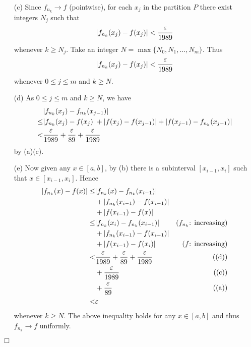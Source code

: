 \documentclass{article}
\begin{document}
\begin{enumerate}
\begin{enumerate}
  \item[(c)]
    Since $f_{n_k} \to f$ (pointwise), for each $x_j$ in the partition $P$
    there exist integers $N_j$ such that
    \[
      \abs{ f_{n_k}(x_j) - f(x_j) } < \frac{\varepsilon}{1989}
    \]
    whenever $k \geq N_j$.
    Take an integer $N = \max\{N_0, N_1, \ldots, N_m\}$. Thus
    \[
      \abs{ f_{n_k}(x_j) - f(x_j) } < \frac{\varepsilon}{1989}
    \]
    whenever $0 \leq j \leq m$ and $k \geq N$.

  \item[(d)]
    As $0 \leq j \leq m$ and $k \geq N$, we have
      \begin{align*}
        &\abs{f_{n_k}(x_j) - f_{n_k}(x_{j-1})} \\
        \leq&
        \abs{f_{n_k}(x_j) - f(x_j)}
          + \abs{f(x_j) - f(x_{j-1})}
          + \abs{f(x_{j-1}) - f_{n_k}(x_{j-1})} \\
        <&
        \frac{\varepsilon}{1989}
          + \frac{\varepsilon}{89}
          + \frac{\varepsilon}{1989}
      \end{align*}
    by (a)(c).

  \item[(e)]
    Now given any $x \in [a,b]$, by (b) there is a subinterval $[x_{i-1},x_i]$
    such that $x \in [x_{i-1},x_i]$.
    Hence
    \begin{align*}
      \abs{f_{n_k}(x) - f(x)}
      \leq&
      \abs{f_{n_k}(x) - f_{n_k}(x_{i-1})} \\
        &+ \abs{f_{n_k}(x_{i-1}) - f(x_{i-1})} \\
        &+ \abs{f(x_{i-1}) - f(x)} \\
      \leq&
      \abs{f_{n_k}(x_i) - f_{n_k}(x_{i-1})}
          &\text{($f_{n_k}$: increasing)} \\
        &+ \abs{f_{n_k}(x_{i-1}) - f(x_{i-1})} \\
        &+ \abs{f(x_{i-1}) - f(x_i)}
          &\text{($f$: increasing)} \\
      <&
      \frac{\varepsilon}{1989}
          + \frac{\varepsilon}{89}
          + \frac{\varepsilon}{1989}
          &\text{((d))} \\
        &+ \frac{\varepsilon}{1989}
          &\text{((c))} \\
        &+ \frac{\varepsilon}{89}
          &\text{((a))} \\
      <& \varepsilon
    \end{align*}
    whenever $k \geq N$.
    The above inequality holds for any $x \in [a,b]$
    and thus $f_{n_k} \to f$ uniformly.
  \end{enumerate}
\end{enumerate}
$\Box$ \\\\
\end{document}
